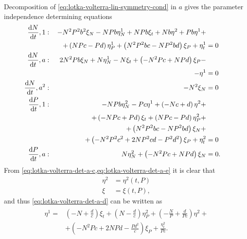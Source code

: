 Decomposition of \cref{eq:lotka-volterra-lin-symmetry-cond} in \(a\) gives the parameter independence determining equations
\begin{subequations}\label{eq:lotka-volterra-det-a}
  \begin{flalign}
    \diff{N}{t}, 1 & : & - N^{2} P^{2} b^{2} \xi_{N} - N P b \eta^1_{N} + N P b \xi_{t} + N b \eta^{2} + P b \eta^{1} +&&&\\
    &&\quad+ \left(N P c - P d\right) \eta^1_{P} + \left(N^{2} P^{2} b c - N P^{2} b d\right) \xi_{P} + \eta^1_{t} &= 0 && \FlLabel{eq:lotka-volterra-det-a-a}\\
    \diff{N}{t}, a & : & 2 N^{2} P b \xi_{N} + N \eta^1_{N} - N \xi_{t} + \left(- N^{2} P c + N P d\right) \xi_{P} -&&&\\
    &&\quad- \eta^{1} &= 0 && \FlLabel{eq:lotka-volterra-det-a-b}\\
    \diff{N}{t}, a^2 & : & - N^{2} \xi_{N} &= 0 && \FlLabel{eq:lotka-volterra-det-a-c}\\
    \diff{P}{t}, 1 & : & - N P b \eta^2_{N} - P c \eta^{1} + \left(- N c + d\right) \eta^{2} +&&&\\
    &&\quad+  \left(- N P c + P d\right) \xi_{t} + \left(N P c - P d\right) \eta^2_{P} +&&&\\
    &&\quad+ \left(N^{2} P^{2} b c - N P^{2} b d\right) \xi_{N} +&&&\\
    &&\quad+ \left(- N^{2} P^{2} c^{2} + 2 N P^{2} c d - P^{2} d^{2}\right) \xi_{P} + \eta^2_{t} &= 0 && \FlLabel{eq:lotka-volterra-det-a-d}\\
    \diff{P}{t}, a & : & N \eta^2_{N} + \left(- N^{2} P c + N P d\right) \xi_{N} &= 0. && \FlLabel{eq:lotka-volterra-det-a-e}
  \end{flalign}
\end{subequations}
From \cref{eq:lotka-volterra-det-a-c,eq:lotka-volterra-det-a-e} it is clear that
\begin{subequations} \label{eq:lotka-volterra-a-first-simplification}
  \begin{align}
    \eta^2 &= \eta^2(t, P)\\
    \xi &= \xi(t, P),
  \end{align}
\end{subequations}
and thus \cref{eq:lotka-volterra-det-a-d} can be written as
\begin{align}
  \begin{split}
    \eta^{1} =& \left(- N + \frac{d}{c}\right) \xi_{t} + \left(N - \frac{d}{c}\right) \eta^2_{P} + \left(- \frac{N}{P} + \frac{d}{P c}\right) \eta^{2} +\\
    &+ \left(- N^{2} P c + 2 N P d - \frac{P d^{2}}{c}\right) \xi_{P} + \frac{\eta^2_{t}}{P c}.
  \end{split}
\end{align}
